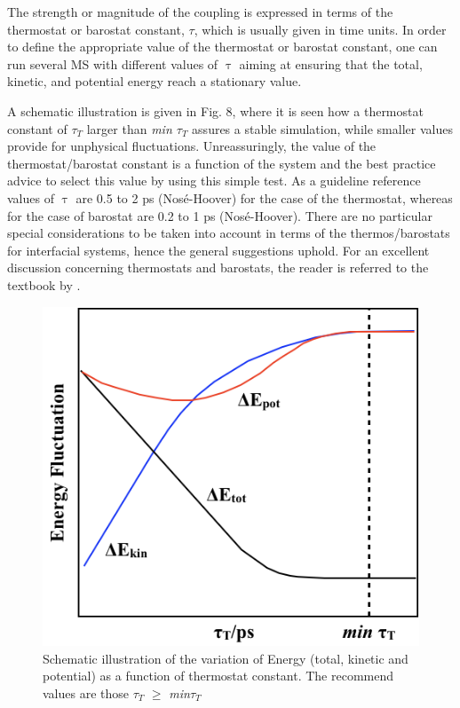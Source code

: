 \documentclass{scrbook}
\begin{document}
The strength or magnitude of the coupling is expressed in terms of the
thermostat or barostat constant, {${\tau}$}, which is usually given in time
units. In order to define the appropriate value of the thermostat or barostat
constant, one can run several MS with different values of {${\uptau}$} aiming
at ensuring that the total, kinetic, and potential energy reach a stationary
value.

A schematic illustration is given in Fig. 8, where it is seen how a thermostat
constant of ${\tau}$$_{T}$ larger than \textit{min ${\tau}$}$_{T}$ assures
a stable simulation, while smaller values provide for unphysical fluctuations.
Unreassuringly, the value of the thermostat/barostat constant is a function of
the system and the best practice advice to select this value by using this
simple test. As a guideline reference values of {${\uptau}$} are 0.5 to 2 ps
(Nos\'{e}-Hoover) for the case of the thermostat, whereas for the case of
barostat are 0.2 to 1 ps (Nos\'{e}-Hoover). There are no particular special
considerations to be taken into account in terms of the thermos/barostats for
interfacial systems, hence the general suggestions uphold. For an excellent
discussion concerning thermostats and barostats, the reader is referred to the
textbook by \citet{tuckerman2010}.

\begin{figure}
\includegraphics[width=1\textwidth]{gfx/image25.png}
\caption{Schematic illustration of the variation of Energy (total, kinetic and potential) as a function of thermostat constant. The recommend values are those ${\tau}$$_{ T}$ ${\geq}$ \textit{min${\tau}$}$_{T}$}
\label{fig:5}
\end{figure}
\end{document}
